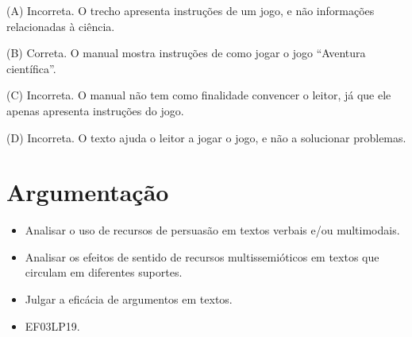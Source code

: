 \begin{boxlist}
(A) Incorreta. O trecho apresenta instruções de um jogo, e não
informações relacionadas à ciência.

(B) Correta. O manual mostra instruções de como jogar o jogo ``Aventura
científica''.

(C) Incorreta. O manual não tem como finalidade convencer o leitor, já
que ele apenas apresenta instruções do jogo.

(D) Incorreta. O texto ajuda o leitor a jogar o jogo, e não a solucionar
problemas.

\chapter{Argumentação}



\begin{itemize}
  \item Analisar o uso de recursos de persuasão em textos verbais e/ou
multimodais.
  \item Analisar os efeitos de sentido de recursos multissemióticos em
textos que circulam em diferentes suportes.
  \item Julgar a eficácia de argumentos em textos.
\end{itemize}


\begin{itemize}
  \item EF03LP19.
\end{itemize}

\end{boxlist}
